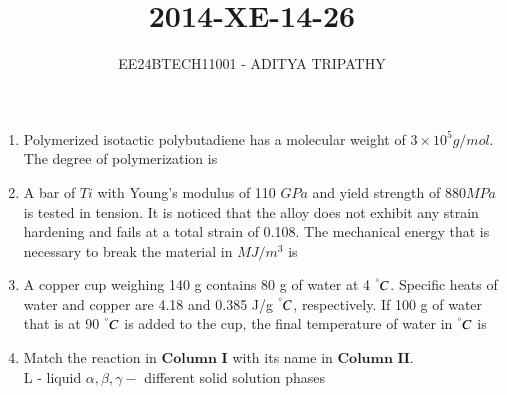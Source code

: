 \documentclass[journal,12pt,onecolumn]{IEEEtran}
\theoremstyle{remark}
\begin{document}

\vspace{3cm}

\title{2014-XE-14-26}
\author{EE24BTECH11001 -  ADITYA TRIPATHY}
\maketitle

\renewcommand{\thefigure}{\theenumi}
\renewcommand{\thetable}{\theenumi}

\begin{enumerate}
    \item 
        Polymerized isotactic polybutadiene has a molecular weight of $3 \times 10^5 g/mol$. The degree of
        polymerization is
        \hfill{}
        \\
    \item  A bar of $Ti$ with Young's modulus of 110 $GPa$ and yield strength of $880 MPa$ is tested in tension. It
        is noticed that the alloy does not exhibit any strain hardening and fails at a total strain of 0.108. The
        mechanical energy that is necessary to break the material in $MJ/m^3$ is		
        \hfill{}
        \\
    \item A copper cup weighing 140 g contains 80 g of water at 4 $^{\degree}C$. Specific heats of water and copper are
        4.18 and 0.385 J/g $^{\degree}C$, respectively. If 100 g of water that is at 90 $^{\degree}C$ is added to the cup, the final
        temperature of water in $^{\degree}C$ is
        \hfill{}
        \\

    \item Match the reaction in $\textbf{Column I}$ with its name in $\textbf{Column II}$.\\
        L - liquid $\alpha, \beta, \gamma -$ different solid solution phases
\begin{center}


\end{center}
\end{enumerate}
\end{document}

